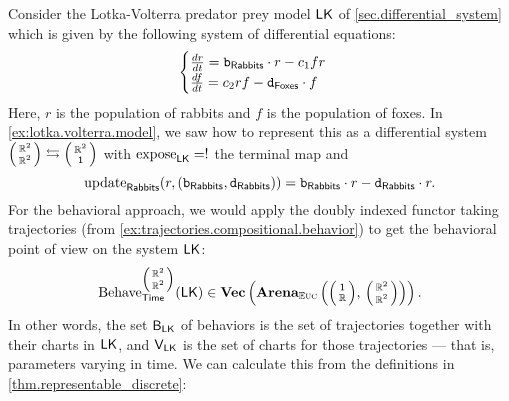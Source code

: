 \documentclass[DynamicalBook]{subfiles}
\begin{document}
\begin{example}
Consider the Lotka-Volterra predator prey model $\mathsf{LK}$ of
\cref{sec.differential_system} which is given by the following system of
differential equations:
\[
  \begin{cases}
    
\frac{dr}{dt} =  \mathtt{b}_{\mathsf{Rabbits}}
\cdot r - c_1 f r \\
\frac{df}{dt} = c_2 r f - \mathtt{d}_{\mathsf{Foxes}}
\cdot f
  \end{cases}
\]
Here, $r$ is the population of rabbits and $f$ is the population of foxes. In
\cref{ex:lotka.volterra.model}, we saw how to represent this as a differential
system $\lens{\rr^2}{\rr^2} \fromto \lens{\rr^2}{\ord{1}}$ with $\mathrm{expose}_{\mathsf{LK}} =
!$ the terminal map and
  \[
\mathrm{update}_{\mathsf{\mathsf{Rabbits}}}( {r, (\mathtt{b}_{\mathsf{Rabbits}}, \mathtt{d}_{\mathsf{Rabbits}})} )
= \mathtt{b}_{\mathsf{Rabbits}} \cdot r - \mathtt{d}_{\mathsf{Rabbits}} \cdot r.
\]
For the behavioral approach, we would apply the doubly indexed functor
taking trajectories (from \cref{ex:trajectories.compositional.behavior}) to get
the behavioral point of view on the system $\mathsf{LK}$: 
\[
\Fun{Behave}_{\Sys{Time}}^{\littlelens{\rr^2}{\rr^2}}(\Sys{LK}) \in \Cat{Vec}\left(
  \Cat{Arena}_{\eucdiff}\left( \littlelens{\ord{1}}{\rr},\,
    \littlelens{\rr^2}{\rr^2} \right) \right).
\]
In other words, the set $\mathsf{B}_{\mathsf{LK}}$ of behaviors is the set of trajectories together
with their charts in $\mathsf{LK}$, and $\mathsf{V}_{\mathsf{LK}}$ is the set of charts
for those trajectories --- that is, parameters varying in time. We can calculate
this from the definitions in \cref{thm.representable_discrete}:


\end{example}
\end{document}
